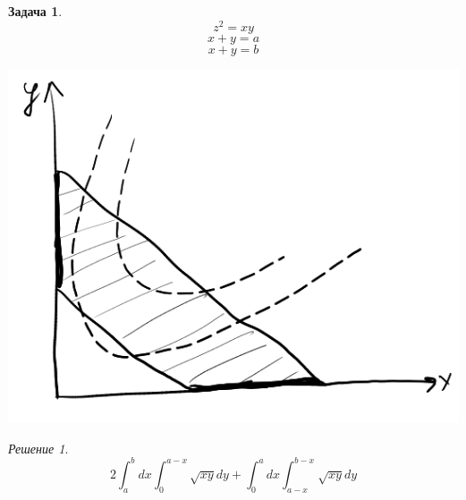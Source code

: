 \documentclass[english]{article}
\theoremstyle{plain}
\theoremstyle{remark}
\newtheorem*{solution}{Решение}
\theoremstyle{definition}
\newtheorem{task}{Задача}
\begin{document}
\begin{task}
\[ z^2 = xy \]
\[ x + y = a \]
\[ x + y = b \]
\begin{center}
\includegraphics[scale=0.5]{4_7.png}
\end{center}
\end{task}
\begin{solution}
\[ 2 \int^b_a dx \int^{a - x}_0 \sqrt{xy} dy + \int^a_0 dx \int^{b - x}_{a - x}\sqrt{xy}dy \]
\end{solution}
\end{document}
